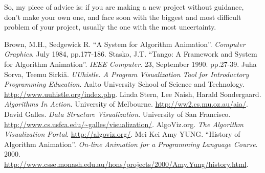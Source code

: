 \documentclass{article}
\begin{document}
So, my piece of advice is: if you are making a new project without guidance,
don't make your own one, and face soon with the biggest and most difficult
problem of your project, usually the one with the most uncertainty.

\begin{thebibliography}{99}
 Brown, M.H., Sedgewick R. ``A System for Algorithm Animation''.
  \textit{Computer Graphics}. July 1984, pp.177-186.
 Stasko, J.T. ``Tango: A Framework and System for Algorithm
  Animation''. \textit{IEEE Computer}. 23, September 1990. pp.27-39.
 Juha Sorva, Teemu Sirkiä. \textit{UUhistle. A Program
  Visualization Tool for Introductory Programming Education}. Aalto University
  School of Science and Technology. \url{http://www.uuhistle.org/index.php}.
 Linda Stern, Lee Naish, Harald
  Sondergaard. \textit{Algorithms In Action}. University of Melbourne.
  \url{http://ww2.cs.mu.oz.au/aia/}.
 David Galles. \textit{Data Structure Visualization}. University
  of San Francisco. \url{http://www.cs.usfca.edu/~galles/visualization/}.
 AlgoViz.org. \textit{The Algorithm Visualization Portal}.
  \url{http://algoviz.org/}.
 Mei Kei Amy YUNG. ``History of Algorithm
  Animation''. \textit{On-line Animation for a Programming Language
    Course}. 2000.
    \url{http://www.csse.monash.edu.au/hons/projects/2000/Amy.Yung/history.html}.
\end{thebibliography}

\end{document}

